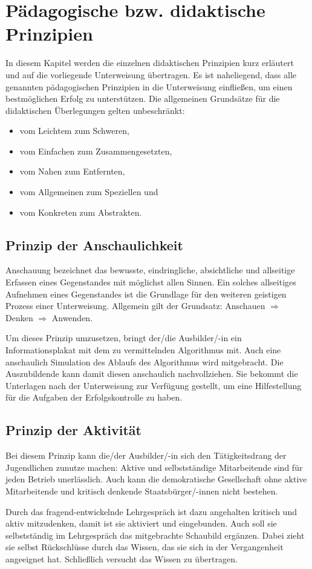 \chapter{Pädagogische bzw. didaktische Prinzipien}
In diesem Kapitel werden die einzelnen didaktischen Prinzipien kurz erläutert und auf die vorliegende Unterweisung übertragen. Es ist naheliegend, dass alle genannten pädagogischen Prinzipien in die Unterweisung einfließen, um einen bestmöglichen Erfolg zu unterstützen. Die allgemeinen Grundsätze für die didaktischen Überlegungen gelten unbeschränkt: 

\begin{itemize}
	\item vom Leichtem zum Schweren,
	\item vom Einfachen zum Zusammengesetzten, 
	\item vom Nahen zum Entfernten, 
	\item vom Allgemeinen zum Speziellen und 
	\item vom Konkreten zum Abstrakten.
	
\end{itemize}

\section{Prinzip der Anschaulichkeit}
Anschauung bezeichnet das bewusste, eindringliche, absichtliche und allseitige Erfassen eines Gegenstandes mit möglichst allen Sinnen. Ein solches allseitiges Aufnehmen eines Gegenstandes ist die Grundlage für den weiteren geistigen Prozess einer Unterweisung.\autocite[vgl.][S.\,161ff.]{schroder_lernen_2010} Allgemein gilt der Grundsatz: Anschauen $\Rightarrow$ Denken $\Rightarrow$ Anwenden.
\par
Um dieses Prinzip umzusetzen, bringt der/die Ausbilder/-in ein Informationsplakat mit dem zu vermittelnden Algorithmus mit. Auch eine anschaulich Simulation des Ablaufs des Algorithmus wird mitgebracht. Die Auszubildende kann damit diesen anschaulich nachvollziehen. Sie bekommt die Unterlagen nach der Unterweisung zur Verfügung gestellt, um eine Hilfestellung für die Aufgaben der Erfolgskontrolle zu haben.

\section{Prinzip der Aktivität}
Bei diesem Prinzip kann die/der Ausbilder/-in sich den Tätigkeitsdrang der Jugendlichen zunutze machen: Aktive und selbstständige Mitarbeitende sind für jeden Betrieb unerlässlich. Auch kann die demokratische Gesellschaft ohne aktive Mitarbeitende und kritisch denkende Staatsbürger/-innen nicht bestehen.
\par
Durch das fragend-entwickelnde Lehrgespräch ist \Azubi dazu angehalten kritisch und aktiv mitzudenken, damit ist sie aktiviert und eingebunden. Auch soll sie selbstständig im Lehrgespräch das mitgebrachte Schaubild ergänzen. Dabei zieht sie selbst Rückschlüsse durch das Wissen, das sie sich in der Vergangenheit angeeignet hat. Schließlich versucht \Azubi das Wissen zu übertragen. 

